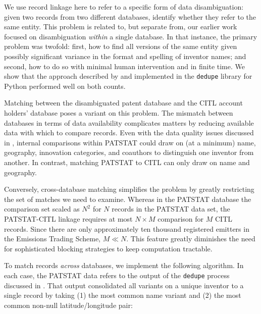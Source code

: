 \documentclass[11pt]{article}
\begin{document}
We use record linkage here to refer to a specific form of data
disambiguation: given two records from two different databases,
identify whether they refer to the same entity. This problem is
related to, but separate from, our earlier work \citep{huberty2013a}
focused on disambiguation \textit{within} a single database. In that
instance, the primary problem was twofold: first, how to find all
versions of the same entity given possibly significant variance in the
format and spelling of inventor names; and second, how to do so with
minimal human intervention and in finite time. We show that the
approach described by \cite{bilenko2006learnable} and implemented in
the \texttt{dedupe} library for Python performed well on both counts.

Matching between the disambiguated patent database and the CITL
account holders' database poses a variant on this problem. The
mismatch between databases in terms of data availability complicates
matters by reducing available data with which to compare records. Even
with the data quality issues discussed in \cite{huberty2013a},
internal comparisons within PATSTAT could draw on (at a minimum) name,
geography, innovation categories, and coauthors to distinguish one
inventor from another. In contrast, matching PATSTAT to CITL can only
draw on name and geography.

Conversely, cross-database matching simplifies the problem by greatly
restricting the set of matches we need to examine. Whereas in the
PATSTAT database the comparison set scaled as $N^2$ for $N$ records in
the PATSTAT data set, the PATSTAT-CITL linkage requires at most $N
\times M$ comparison for $M$ CITL records. Since there are only
approximately ten thousand registered emitters in the Emissions
Trading Scheme, $M \ll N$. This feature greatly diminishes the need
for sophisticated blocking strategies to keep computation tractable.

To match records \textit{across} databases, we implement the following
algorithm. In each case, the PATSTAT data refers to the output of the
\texttt{dedupe} process discussed in \cite{huberty2013a}. That output
consolidated all variants on a unique inventor to a single record by
taking (1) the most common name variant and (2) the most common non-null
latitude/longitude pair:
\end{document}
